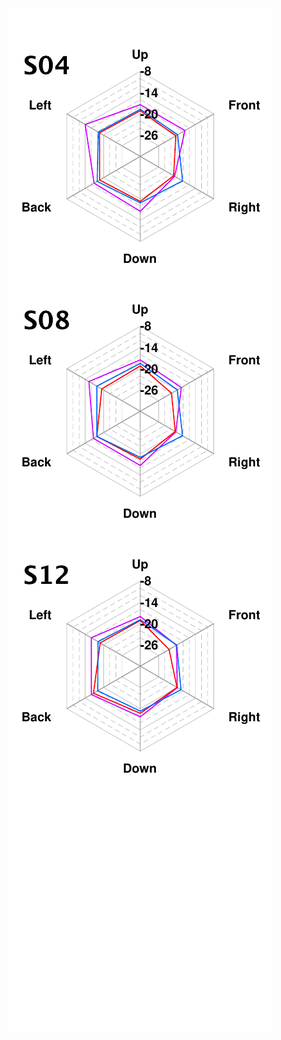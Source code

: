 \documentclass[11pt,a4j]{jreport}
\begin{document}
\begin{figure}[H]
\begin{minipage}{.5\linewidth}
    \includegraphics[scale=.77]{images/realHallDirSt/allPoint/reshaped/fLeftPage.pdf}
  \end{minipage}
\end{figure}
\end{document}
